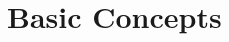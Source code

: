 \documentclass[authoryear,preprint,review,12pt]{elsarticle}
\begin{document}
\section{Basic Concepts}\label{basicConcepts}
%
%  
%  
\end{document}
